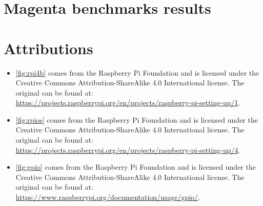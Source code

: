 \appendix
\appendixpage

\section{Magenta benchmarks results}
\label{appendix:magenta_benchmark}
\begin{minipage}{\linewidth}
    \begin{adjustbox}{width=\textwidth}
    \end{adjustbox}
\end{minipage}

\section{Attributions}

\begin{itemize}
    \item \autoref{fig:rpi4b} comes from the Raspberry Pi Foundation and is licensed under the Creative
          Commons Attribution-ShareAlike 4.0 International license. The original can be found at:
          \url{https://projects.raspberrypi.org/en/projects/raspberry-pi-setting-up/1}.

    \item \autoref{fig:rpios} comes from the Raspberry Pi Foundation and is licensed under the Creative
          Commons Attribution-ShareAlike 4.0 International license. The original can be found at:
          \url{https://projects.raspberrypi.org/en/projects/raspberry-pi-setting-up/4}.

    \item \autoref{fig:gpio} comes from the Raspberry Pi Foundation and is licensed under the Creative
          Commons Attribution-ShareAlike 4.0 International license. The original can be found at:
          \url{https://www.raspberrypi.org/documentation/usage/gpio/}.
\end{itemize}
